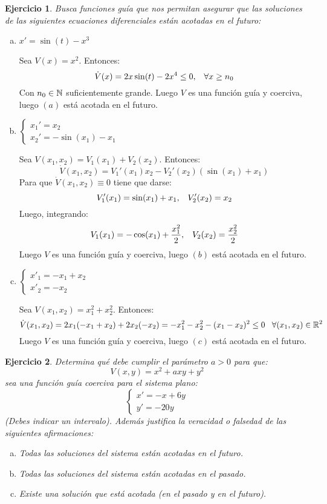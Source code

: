 \documentclass[12pt]{article}
\newtheorem{ejercicio}{Ejercicio}
\theoremstyle{definition}
\theoremstyle{remark}
\begin{document}
\begin{ejercicio}
Busca funciones guía que nos permitan asegurar que las soluciones de las siguientes ecuaciones diferenciales están acotadas en el futuro:
\end{ejercicio}
\begin{enumerate}[(a)]
\item $x'=\sin(t)-x^3$

Sea $V(x)=x^2$. Entonces:
\[
\dot{V}(x)=2x\sin(t)-2x^4\leq 0, \;\;\; \forall x\geq n_0
\]
Con $n_0\in\mathbb{N}$ suficientemente grande. Luego $V$ es una función guía y coerciva, luego $(a)$ está acotada en el futuro.

\item $
\left\{
\begin{array}{l}
x_1'=x_2\\
x_2'=-\sin(x_1)-x_1
\end{array}
\right.
$

Sea $V(x_1,x_2)=V_1(x_1)+V_2(x_2)$. Entonces:
\[
\dot{V}(x_1,x_2)=V_1'(x_1)x_2-V_2'(x_2)(\sin(x_1)+x_1)
\]
Para que $\dot{V}(x_1,x_2)\equiv 0$ tiene que darse:
\[
V_1'(x_1)=\sin(x_1)+x_1, \;\;\; V_2'(x_2)=x_2
\]
Luego, integrando:
\[
V_1(x_1)=-\cos(x_1)+\frac{x_1^2}{2}, \;\;\; V_2(x_2)=\frac{x_2^2}{2}
\]
Luego $V$ es una función guía y coerciva, luego $(b)$ está acotada en el futuro.
\item $
\left\{
\begin{array}{l}
x'_1=-x_1+x_2\\
x'_2=-x_2
\end{array}
\right.
$

Sea $V(x_1,x_2)=x_1^2+x_2^2$. Entonces:
\[
\dot{V}(x_1,x_2)=2x_1(-x_1+x_2)+2x_2(-x_2)=-x_1^2-x_2^2-(x_1-x_2)^2\leq 0 \;\;\; \forall (x_1,x_2)\in\mathbb{R}^2
\]
Luego $V$ es una función guía y coerciva, luego $(c)$ está acotada en el futuro.
\end{enumerate}

\begin{ejercicio}
Determina qué debe cumplir el parámetro $a>0$ para que:
\[
V(x,y)=x^2+axy+y^2
\]
sea una función guía coerciva para el sistema plano:
\[
\left\{
\begin{array}{l}
x'=-x+6y\\
y'=-20y
\end{array}
\right.
\]
(Debes indicar un intervalo). Además justifica la veracidad o falsedad de las siguientes afirmaciones:
\begin{enumerate}[(a)]
\item Todas las soluciones del sistema están acotadas en el futuro.
\item Todas las soluciones del sistema están acotadas en el pasado.
\item Existe una solución que está acotada (en el pasado y en el futuro).
\end{enumerate}
\end{ejercicio}
\end{document}
